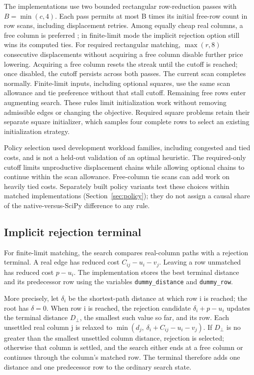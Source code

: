 \documentclass[11pt,a4paper]{article}
\begin{document}
The implementations use two bounded rectangular row-reduction passes with \(B=\min(c,4)\). Each pass permits at most B times its initial free-row count in row scans, including displacement retries. Among equally cheap real columns, a free column is preferred \cite{bijsterbosch2010}; in finite-limit mode the implicit rejection option still wins its computed ties. For required rectangular matching, \(\max(r,8)\) consecutive displacements without acquiring a free column disable further price lowering. Acquiring a free column resets the streak until the cutoff is reached; once disabled, the cutoff persists across both passes. The current scan completes normally. Finite-limit inputs, including optional squares, use the same scan allowance and tie preference without that stall cutoff. Remaining free rows enter augmenting search. These rules limit initialization work without removing admissible edges or changing the objective. Required square problems retain their separate square initializer, which samples four complete rows to select an existing initialization strategy.

Policy selection used development workload families, including congested and tied costs, and is not a held-out validation of an optimal heuristic. The required-only cutoff limits unproductive displacement chains while allowing optional chains to continue within the scan allowance. Free-column tie scans can add work on heavily tied costs. Separately built policy variants test these choices within matched implementations (Section~\ref{sec:policy}); they do not assign a causal share of the native-versus-SciPy difference to any rule.

\subsection{Implicit rejection terminal}

For finite-limit matching, the search compares real-column paths with a rejection terminal. A real edge has reduced cost \(C_{ij}-u_i-v_j\). Leaving a row unmatched has reduced cost \(p-u_i\). The implementation stores the best terminal distance and its predecessor row using the variables \texttt{dummy\_distance} and \texttt{dummy\_row}.

More precisely, let \(\delta_i\) be the shortest-path distance at which row i is reached; the root has \(\delta=0\). When row i is reached, the rejection candidate \(\delta_i+p-u_i\) updates the terminal distance \(D_\perp\), the smallest such value so far, and its row. Each unsettled real column j is relaxed to \(\min(d_j,\ \delta_i+C_{ij}-u_i-v_j)\). If \(D_\perp\) is no greater than the smallest unsettled column distance, rejection is selected; otherwise that column is settled, and the search either ends at a free column or continues through the column's matched row. The terminal therefore adds one distance and one predecessor row to the ordinary search state.
\end{document}
